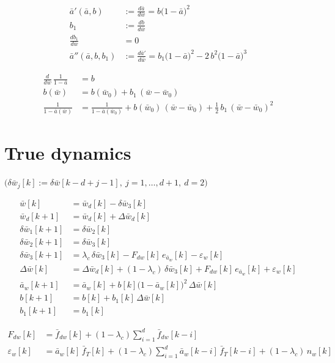 \documentclass[11pt,a4paper,fontset=none]{ctexart}
\newcommand{\ba}{\bar{a}}
\newcommand{\bw}{\bar{w}}
\newcommand{\dW}{\Delta\bw}
\newcommand{\ap}{\ba'}
\newcommand{\app}{\ba''}
\newcommand{\fd}{\bar f_{dw}}
\newcommand{\ea}{e_{\ba_w}}
\begin{document}
\begin{align*}
\ap(\ba, b)          &:= \frac{d\ba}{d\bw} = b\bigl(1-\ba\bigr)^{2} \\
b_1                  &:= \frac{db}{d\bw} \\
\frac{db_1}{d\bw}    &= 0 \\
\app(\ba, b, b_1)    &:= \frac{d\ap}{d\bw} = b_1\bigl(1-\ba\bigr)^{2} - 2\,b^{2}\bigl(1-\ba\bigr)^{3}
\end{align*}

\begin{align*}
\frac{d}{d\bw}\,\frac{1}{1-\ba}  &= b \\
b(\bw)                          &= b(\bw_0) + b_1\,(\bw - \bw_0) \\
\frac{1}{1-\ba(\bw)}            &= \frac{1}{1-\ba(\bw_0)} + b(\bw_0)\,(\bw - \bw_0) + \tfrac{1}{2}\,b_1\,(\bw - \bw_0)^{2}
\end{align*}

\section{True dynamics}

$\bigl(\delta\bw_j[k] := \delta\bw[k-d+j-1],\ j = 1,\dots,d+1,\ d = 2\bigr)$

\begin{align*}
\bw[k]           &= \bw_d[k] - \delta\bw_3[k] \\
\bw_d[k+1]       &= \bw_d[k] + \Delta\bw_d[k] \\
\delta\bw_1[k+1] &= \delta\bw_2[k] \\
\delta\bw_2[k+1] &= \delta\bw_3[k] \\
\delta\bw_3[k+1] &= \lambda_c\,\delta\bw_3[k] - F_{dw}[k]\,\ea[k] - \varepsilon_w[k] \\
\dW[k]           &= \Delta\bw_d[k] + (1-\lambda_c)\,\delta\bw_3[k] + F_{dw}[k]\,\ea[k] + \varepsilon_w[k] \\
\ba_w[k+1]       &= \ba_w[k] + b[k]\bigl(1-\ba_w[k]\bigr)^{2}\,\dW[k] \\
b[k+1]           &= b[k] + b_1[k]\,\dW[k] \\
b_1[k+1]         &= b_1[k]
\end{align*}

\begin{align*}
F_{dw}[k]        &= \fd[k] + (1-\lambda_c)\sum_{i=1}^{d}\fd[k-i] \\
\varepsilon_w[k] &= \ba_w[k]\,\bar f_T[k] + (1-\lambda_c)\sum_{i=1}^{d}\ba_w[k-i]\,\bar f_T[k-i] + (1-\lambda_c)\,n_w[k]
\end{align*}
\end{document}
